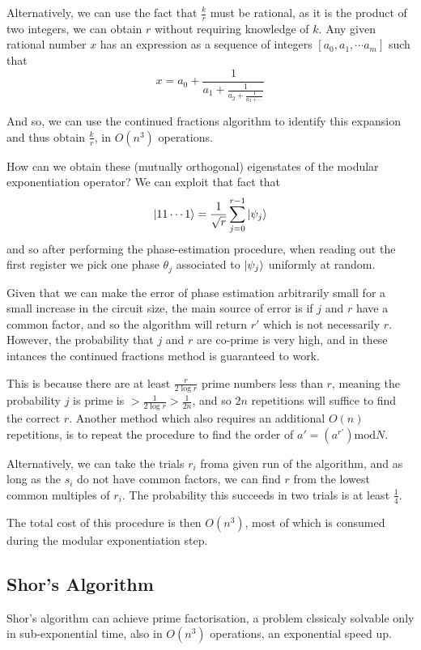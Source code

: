 \documentclass[11pt]{article}
\begin{document}
Alternatively, we can use the fact that $\frac{k}{r}$ must be rational, as it is the product of two integers, we can obtain $r$ without requiring knowledge of $k$. Any given rational number $x$ has an expression as a sequence of integers $[a_{0},a_{1},\cdots a_{m}]$ such that
\begin{equation}
    x = a_{0}+\frac{1}{a_{1}+\frac{1}{a_{2}+\frac{1}{a_{3}+\cdots}}}
\end{equation}

And so, we can use the continued fractions algorithm to identify this expansion and thus obtain $\frac{k}{r}$, in $O(n^{3})$ operations.

How can we obtain these (mutually orthogonal) eigenstates of the modular exponentiation operator? We can exploit that fact that
\begin{equation}
    \ket{11\cdots 1} = \frac{1}{\sqrt{r}}\sum_{j=0}^{r-1}\ket{\psi_{j}}
\end{equation}
and so after performing the phase-estimation procedure, when reading out the first register we pick one phase $\theta_{j}$ associated to $\ket{\psi_{j}}$ uniformly at random.

Given that we can make the error of phase estimation arbitrarily small for a small increase in the circuit size, the main source of error is if $j$ and $r$ have a common factor, and so the algorithm will return $r'$ which is not necessarily $r$. However, the probability that $j$ and $r$ are co-prime is very high, and in these intances the continued fractions method is guaranteed to work.

This is because there are at least $\frac{r}{2\log r}$ prime  numbers less than $r$, meaning the probability $j$ is prime is $> \frac{1}{2\log r} > \frac{1}{2 n}$, and so $2 n$ repetitions will suffice to find the correct $r$. Another method which also requires an additional $O(n)$ repetitions, is to repeat the procedure to find the order of $a'=(a^{r'})\text{mod}N$.

Alternatively, we can take the trials $r_{i}$ froma given run of the algorithm, and as long as the $s_{i}$ do not have common factors, we can find $r$ from the lowest common multiples of $r_{i}$. The probability this succeeds in two trials is at least $\frac{1}{4}$.

The total cost of this procedure is then $O(n^{3})$, most of which is consumed during the modular exponentiation step.

\subsection*{Shor's Algorithm}
Shor's algorithm can achieve prime factorisation, a problem clssicaly solvable only in sub-exponential time, also in $O(n^{3})$ operations, an exponential speed up.
\end{document}
